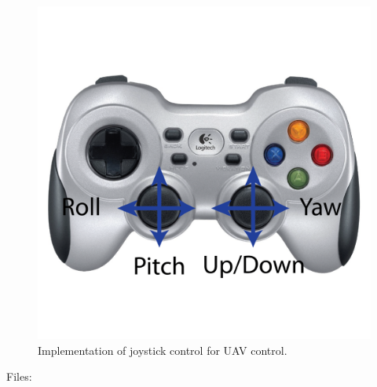 \begin{figure}[hbtp]
\centering
\includegraphics[scale=0.5]{graphics/joycontrol/joycontrol.png}
\caption{Implementation of joystick control for UAV control.}
\end{figure}

\noindent
Files:

